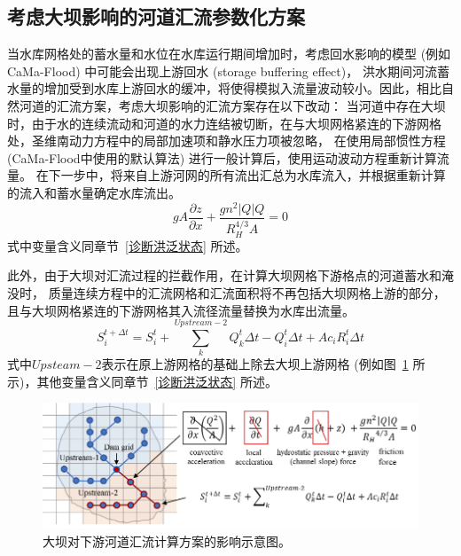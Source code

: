 \subsection{考虑大坝影响的河道汇流参数化方案}
当水库网格处的蓄水量和水位在水库运行期间增加时，考虑回水影响的模型 (例如CaMa-Flood) 中可能会出现上游回水 (storage buffering effect)，
洪水期间河流蓄水量的增加受到水库上游回水的缓冲，将使得模拟入流量波动较小。因此，相比自然河道的汇流方案，考虑大坝影响的汇流方案存在以下改动：
当河道中存在大坝时，由于水的连续流动和河道的水力连结被切断，在与大坝网格紧连的下游网格处，圣维南动力方程中的局部加速项和静水压力项被忽略，
在使用局部惯性方程 (CaMa-Flood中使用的默认算法) 进行一般计算后，使用运动波动方程重新计算流量。
在下一步中，将来自上游河网的所有流出汇总为水库流入，并根据重新计算的流入和蓄水量确定水库流出。
\begin{equation}
g A \frac{\partial z}{\partial x}+\frac{g n^{2}|Q| Q}{R_{H}^{4 / 3} A}=0
\end{equation}
式中变量含义同章节~\ref{诊断洪泛状态} 所述。


此外，由于大坝对汇流过程的拦截作用，在计算大坝网格下游格点的河道蓄水和淹没时，
质量连续方程中的汇流网格和汇流面积将不再包括大坝网格上游的部分，
且与大坝网格紧连的下游网格其入流径流量替换为水库出流量。
\begin{equation}
S_{i}^{t+\Delta t}=S_{i}^{t}+\sum_{k}^{Upstream-2} Q_{k}^{t} \Delta t-Q_{i}^{t} \Delta t+A c_{i} R_{i}^{t} \Delta t
\end{equation}
式中$Upsteam-2$表示在原上游网格的基础上除去大坝上游网格 (例如图~\ref{fig:大坝对下游河道汇流计算方案的影响示意图} 所示)，其他变量含义同章节~\ref{诊断洪泛状态} 所述。

{
\begin{figure}[]
\centering
\includegraphics{Figures/陆地表面的水分循环/大坝对下游河道汇流计算方案的影响示意图.png}
\caption{大坝对下游河道汇流计算方案的影响示意图。}
\label{fig:大坝对下游河道汇流计算方案的影响示意图}
\end{figure}
}
